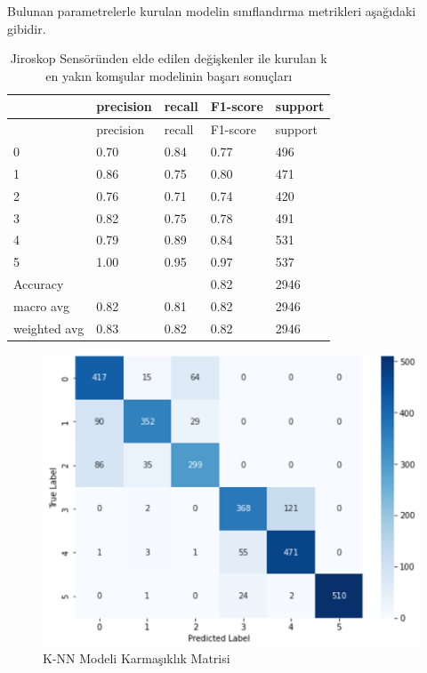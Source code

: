 \documentclass[12pt,twoside]{deuthesis}
\begin{document}
Bulunan parametrelerle kurulan modelin sınıflandırma metrikleri aşağıdaki gibidir.
\begin{longtable}[]{@{}lllll@{}}
\caption{\label{tab:jknn} Jiroskop Sensöründen elde edilen değişkenler ile kurulan k en yakın komşular modelinin başarı sonuçları}\tabularnewline
\toprule()
& precision & recall & F1-score & support \\
\midrule()
\endfirsthead
\toprule()
& precision & recall & F1-score & support \\
\midrule()
\endhead
0 & 0.70 & 0.84 & 0.77 & 496 \\
1 & 0.86 & 0.75 & 0.80 & 471 \\
2 & 0.76 & 0.71 & 0.74 & 420 \\
3 & 0.82 & 0.75 & 0.78 & 491 \\
4 & 0.79 & 0.89 & 0.84 & 531 \\
5 & 1.00 & 0.95 & 0.97 & 537 \\
Accuracy & & & 0.82 & 2946 \\
macro avg & 0.82 & 0.81 & 0.82 & 2946 \\
weighted avg & 0.83 & 0.82 & 0.82 & 2946 \\
\bottomrule()
\end{longtable}
\begin{figure}

{\centering \includegraphics[width=0.9\linewidth,height=0.35\textheight]{figure/knn_conf} 

}

\caption{K-NN Modeli Karmaşıklık Matrisi}\label{fig:knnconf}
\end{figure}
\end{document}
